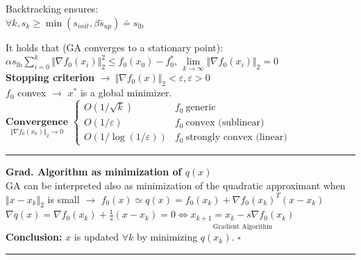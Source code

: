 \documentclass[a4paper]{article}
\begin{document}
\begin{multicols}{2}
\begin{multicols}{2}
        \noindent
        Backtracking ensures:\\
        {\small $\forall{k}, s_k\!\ge\!\min(s_{init}, \beta\bar{s}_{up})\doteq{s_{\text{lb}}}$}
    \end{multicols} 
    \vspace{-0.6cm}
    \noindent
    It holds that (GA converges to a stationary point):\\
    $\alpha{s_{\text{lb}}}\sum_{i=0}^k {\Vert \nabla{f_0}(x_i) \Vert_2^2} \le f_0(x_0)-f_0^*$,  
    $\underset{k\to\infty}{\lim}{\Vert \nabla{f_0}(x_i) \Vert_2}=0$\\
    \textbf{Stopping criterion} $\to \ \Vert \nabla{f_0}(x) \Vert_2 < \varepsilon, \varepsilon>0$\\
    $f_0$ convex $\to$ $x^*$ is a global minimizer.\\
    $\underset{\Vert \nabla{f_0(x_k)} \Vert_2 \to 0}{\textbf{Convergence}}$ $\begin{cases}
        O(1/\sqrt{k})&f_0 \ \text{generic}\\
        O(1/\varepsilon)&f_0 \ \text{convex (sublinear)}\\
        O(1/\log(1/\varepsilon))&f_0 \ \text{strongly convex (linear)}
    \end{cases}$\\
    \hrule\noindent
    \textsf{\textbf{Grad. Algorithm as minimization of $q(x)$}}\\
    GA can be interpreted also as minimization of the quadratic approximant when $\Vert x-x_k \Vert_2$ is small $\to$ $f_0(x)\simeq{q(x)=f_0(x_k) + \nabla{f_0(x_k)}^T(x-x_k)}$\\
    $\nabla{q(x)}\!=\!\nabla{f_0(x_k)}+\frac{1}{s}(x-x_k)=0 \Leftrightarrow\underset{\text{Gradient Algorithm}}{x_{k+1}=x_k-s\nabla{f_0(x_k)}}$\\
    \textbf{Conclusion:} $x$ is updated $\forall{k}$ by minimizing $q(x_k)$. $\square$
 \end{multicols}
\vspace{-1.1cm}
\noindent
\rule{\textwidth}{1.5pt}
\end{document}
